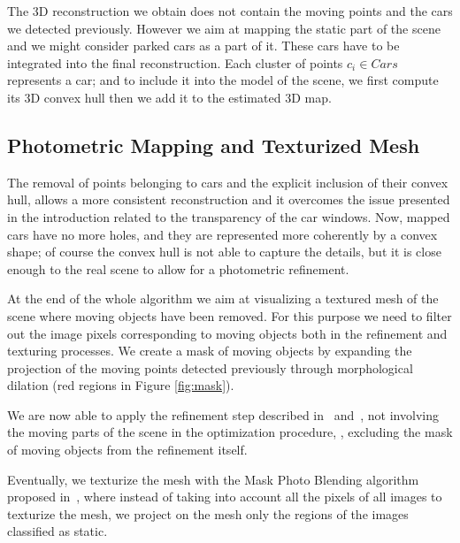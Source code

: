 The 3D reconstruction we obtain does not contain the moving points and the cars we detected previously. 
However we aim at mapping the static part of the scene and we might consider parked cars as a part of it.
These cars have to be integrated into the final reconstruction. 
Each cluster of points $c_i \in Cars$ represents a car; and to include it into the model of the scene, we first compute its 3D convex hull then we add it to the estimated 3D map.

\subsection{Photometric Mapping and Texturized Mesh}
The removal of points belonging to cars and the explicit inclusion of their convex hull, allows a more consistent reconstruction and it overcomes the issue presented in the introduction related to the transparency of the car windows. Now, mapped cars have no more holes, and they are represented more coherently by a convex shape; of course the convex hull is not able to capture the details, but it is close enough to the real scene to allow for a photometric refinement.

At the end of the whole algorithm we aim at visualizing a textured mesh of the scene where moving objects have been removed. 
For this purpose we need to filter out the image pixels corresponding to moving objects both in the refinement and texturing processes.
We create a mask of moving objects by expanding the projection of the moving points detected previously through morphological dilation (red regions in Figure \ref{fig:mask}). 

We are now able to apply the refinement step described in~\cite{vu_et_al_2012} and~\cite{romanoni16}, not involving the moving parts of the scene in the optimization procedure, \ie, excluding the mask of moving objects from the refinement itself.

Eventually, we texturize the mesh with the Mask Photo Blending algorithm proposed in~\cite{callieri2008masked}, where instead of taking into account all the pixels of all images to texturize the mesh, we project on the mesh only the regions of the images classified as static. 

